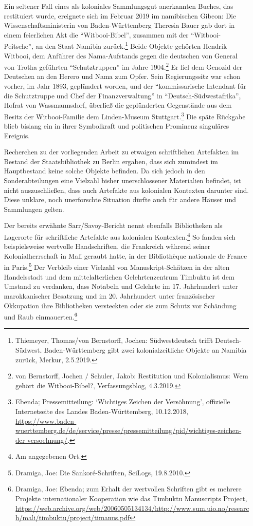 \documentclass[a4paper,
fontsize=11pt,
oneside,
numbers=noperiodatend,
parskip=half-,
bibliography=totoc,
final
]{scrartcl}
\begin{document}
Ein seltener Fall eines als koloniales Sammlungsgut anerkannten Buches,
das restituiert wurde, ereignete sich im Februar 2019 im namibischen
Gibeon: Die Wissenschaftsministerin von Baden-Württemberg Theresia Bauer
gab dort in einem feierlichen Akt die \enquote{Witbooi-Bibel}, zusammen
mit der \enquote{Witbooi-Peitsche}, an den Staat Namibia
zurück.\footnote{Thiemeyer, Thomas/von Bernstorff, Jochen:
  Südwestdeutsch trifft Deutsch-Südwest. Baden-Württemberg gibt zwei
  kolonialzeitliche Objekte an Namibia zurück, Merkur, 2.5.2019.} Beide
Objekte gehörten Hendrik Witbooi, dem Anführer des Nama-Aufstands gegen
die deutschen von General von Trotha geführten \enquote{Schutztruppen}
im Jahre 1904.\footnote{von Bernstorff, Jochen / Schuler, Jakob:
  Restitution und Kolonialismus: Wem gehört die Witbooi-Bibel?,
  Verfassungsblog, 4.3.2019.} Er fiel dem Genozid der Deutschen an den
Herero und Nama zum Opfer. Sein Regierungssitz war schon vorher, im Jahr
1893, geplündert worden, und der \enquote{kommissarische Intendant für
die Schutztruppe und Chef der Finanzverwaltung} in
\enquote{Deutsch-Südwestafrika}, Hofrat von Wassmannsdorf, überließ die
geplünderten Gegenstände aus dem Besitz der Witbooi-Familie dem
Linden-Museum Stuttgart.\footnote{Ebenda; Pressemitteilung:
  \enquote*{Wichtiges Zeichen der Versöhnung}, offizielle Internetseite
  des Landes Baden-Württemberg, 10.12.2018,
  \url{https://www.baden-wuerttemberg.de/de/service/presse/pressemitteilung/pid/wichtiges-zeichen-der-versoehnung/}.}
Die späte Rückgabe blieb bislang ein in ihrer Symbolkraft und
politischen Prominenz singuläres Ereignis.

Recherchen zu der vorliegenden Arbeit zu etwaigen schriftlichen
Artefakten im Bestand der Staatsbibliothek zu Berlin ergaben, dass sich
zumindest im Hauptbestand keine solche Objekte befinden. Da sich jedoch
in den Sonderabteilungen eine Vielzahl bisher unerschlossener
Materialien befindet, ist nicht auszuschließen, dass auch Artefakte aus
kolonialen Kontexten darunter sind. Diese unklare, noch unerforschte
Situation dürfte auch für andere Häuser und Sammlungen gelten.

Der bereits erwähnte Sarr/Savoy-Bericht nennt ebenfalls Bibliotheken als
Lagerorte für schriftliche Artefakte aus kolonialen
Kontexten.\footnote{Am angegebenen Ort.} So fanden sich beispielsweise
wertvolle Handschriften, die Frankreich während seiner
Kolonialherrschaft in Mali geraubt hatte, in der Bibliothèque nationale
de France in Paris.\footnote{Dramiga, Joe: Die Sankoré-Schriften,
  SciLogs, 19.8.2010.} Der Verbleib einer Vielzahl von
Manuskript-Schätzen in der alten Handelsstadt und dem mittelalterlichen
Gelehrtenzentrum Timbuktu ist dem Umstand zu verdanken, dass Notabeln
und Gelehrte im 17. Jahrhundert unter marokkanischer Besatzung und im
20. Jahrhundert unter französischer Okkupation ihre Bibliotheken
versteckten oder sie zum Schutz vor Schändung und Raub
einmauerten.\footnote{Dramiga, Joe: Ebenda; zum Erhalt der wertvollen
  Schriften gibt es mehrere Projekte internationaler Kooperation wie das
  Timbuktu Manuscripts Project,
  \url{https://web.archive.org/web/20060505134134/http://www.sum.uio.no/research/mali/timbuktu/project/timanus.pdf}}
\end{document}
